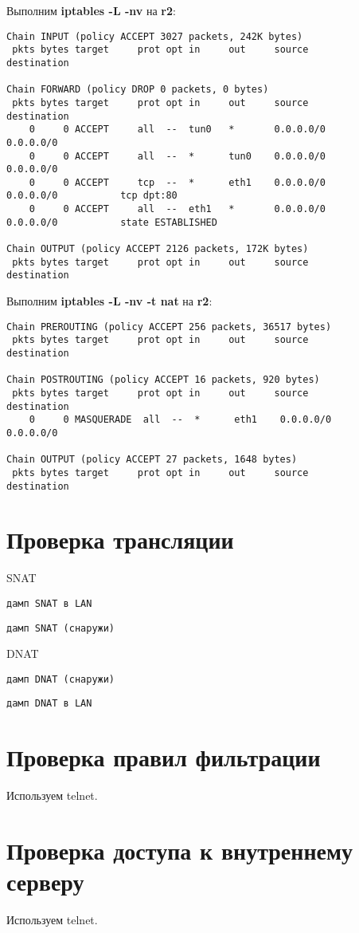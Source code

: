 \documentclass[a4paper,12pt]{article}
\begin{document}
Выполним \textbf{iptables -L -nv} на \textbf{r2}:
\begin{Verbatim}
Chain INPUT (policy ACCEPT 3027 packets, 242K bytes)
 pkts bytes target     prot opt in     out     source               destination         

Chain FORWARD (policy DROP 0 packets, 0 bytes)
 pkts bytes target     prot opt in     out     source               destination         
    0     0 ACCEPT     all  --  tun0   *       0.0.0.0/0            0.0.0.0/0           
    0     0 ACCEPT     all  --  *      tun0    0.0.0.0/0            0.0.0.0/0           
    0     0 ACCEPT     tcp  --  *      eth1    0.0.0.0/0            0.0.0.0/0           tcp dpt:80 
    0     0 ACCEPT     all  --  eth1   *       0.0.0.0/0            0.0.0.0/0           state ESTABLISHED 

Chain OUTPUT (policy ACCEPT 2126 packets, 172K bytes)
 pkts bytes target     prot opt in     out     source               destination     
\end{Verbatim}

Выполним \textbf{iptables -L -nv -t nat} на \textbf{r2}:
\begin{Verbatim}
Chain PREROUTING (policy ACCEPT 256 packets, 36517 bytes)
 pkts bytes target     prot opt in     out     source               destination         

Chain POSTROUTING (policy ACCEPT 16 packets, 920 bytes)
 pkts bytes target     prot opt in     out     source               destination         
    0     0 MASQUERADE  all  --  *      eth1    0.0.0.0/0            0.0.0.0/0           

Chain OUTPUT (policy ACCEPT 27 packets, 1648 bytes)
 pkts bytes target     prot opt in     out     source               destination 
\end{Verbatim}

\section{Проверка трансляции}

SNAT

\begin{Verbatim}
дамп SNAT в LAN
\end{Verbatim}

\begin{Verbatim}
дамп SNAT (снаружи)
\end{Verbatim}

DNAT

\begin{Verbatim}
дамп DNAT (снаружи)
\end{Verbatim}

\begin{Verbatim}
дамп DNAT в LAN
\end{Verbatim}


\section{Проверка правил фильтрации}

Используем telnet.

\section{Проверка доступа к внутреннему серверу}

Используем telnet.
\end{document}
